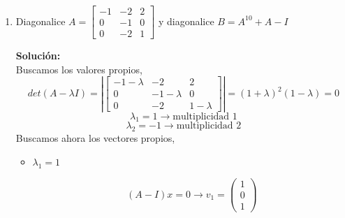 \documentclass[12pt]{article}
\newenvironment{solucion}
{\begin{mdframed}[backgroundcolor=black!10]
		{\bf Solución:}\\
	}
	{
	\end{mdframed}
}
\newenvironment{preguntas}
{\begin{enumerate}\itemsep12pt
	}
	{
	\end{enumerate}
}
\newcommand{\ra}{\rightarrow}
\begin{document}
\begin{preguntas}
\begin{solucion}
			En nuestro ejercicio, debemos considerar $\lambda_1 = \lambda_2 = 1$ y $\lambda_3 = 3$. Entonces,
			$$P = \begin{bmatrix}
			2 & 0 & 0 \\
			0 & 1 & 1 \\
			-1 & 0 & 1
			\end{bmatrix}, \quad
			D = \begin{bmatrix}
			1 & 0 & 0 \\
			0 & 1 & 0 \\
			0 & 0 & 3
			\end{bmatrix}, \quad
			P^{-1} = \begin{bmatrix}
			\frac{1}{2} & 0 & 0 \\
			-\frac{1}{2} & 1 & -1 \\
			\frac{1}{2} & 0 & 1
			\end{bmatrix}$$
			Sea
			$$R = \sqrt[3]{D} = \begin{bmatrix}
			1 & 0 & 0 \\
			0 & 1 & 0 \\
			0 & 0 & \sqrt[3]{3}
			\end{bmatrix}$$
			y sea
			$$N = PRP^{-1}$$
			Notemos que	
			$$N^3 = (PRP^{-1}) = PR\cancel{P^{-1}P}R\cancel{P^{-1}P}RP^{-1} = PR^3P^{-1} = PDP^{-1} = M$$
			Finalmente, $N = P\sqrt[3]{D}P^{-1}$ es la matriz buscada.
\end{solucion}
\item Diagonalice $A =
	\begin{bmatrix} 
	-1 & -2 & 2 \\
	0 & -1 & 0 \\
	0 & -2 & 1
	\end{bmatrix}$ y diagonalice $B = A^{10} + A - I$ 
\begin{solucion}
Buscamos los valores propios,
		$$det(A-\lambda I) = \left|\begin{bmatrix}
		-1-\lambda & -2 & 2 \\
		0 & -1-\lambda & 0 \\
		0 & -2 & 1-\lambda
		\end{bmatrix}\right|
		= (1+\lambda)^2(1-\lambda) = 0$$
		$$\lambda_1 = 1 \ra \text{multiplicidad 1}$$
		$$\lambda_2 = -1 \ra \text{multiplicidad 2}$$
		Buscamos ahora los vectores propios,
		\begin{itemize}
			\item $\lambda_1 = 1$
			
			$$(A-I)x = 0 \ra v_1 = \begin{pmatrix}
			1 \\ 0 \\ 1
			\end{pmatrix}$$
			

\end{itemize}
\end{solucion}
\end{preguntas}
\end{document}
